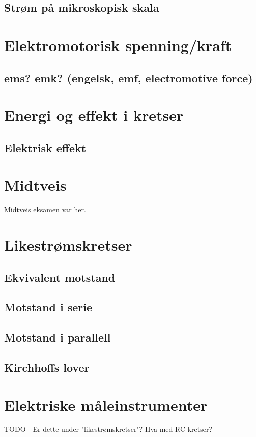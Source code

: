 \documentclass{article}
\begin{document}
    \subsection{Strøm på mikroskopisk skala}
      
  \section{Elektromotorisk spenning/kraft}
    \subsection{ems? emk? (engelsk, emf, electromotive force)}
      
  \section{Energi og effekt i kretser}
    \subsection{Elektrisk effekt}
      
  \section{Midtveis}
    Midtveis eksamen var her.
  \section{Likestrømskretser}
    \subsection{Ekvivalent motstand}
      
    \subsection{Motstand i serie}
      
    \subsection{Motstand i parallell}
      
    \subsection{Kirchhoffs lover}
      
  \section{Elektriske måleinstrumenter}
    TODO - Er dette under "likestrømskretser"?
    Hva med RC-kretser?
\end{document}
